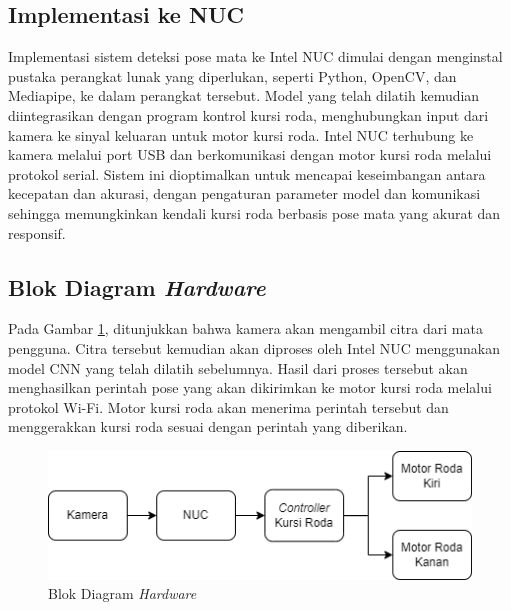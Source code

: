 \subsection{Implementasi ke NUC}

Implementasi sistem deteksi pose mata ke Intel NUC dimulai dengan menginstal pustaka perangkat lunak yang diperlukan, seperti Python, OpenCV, dan Mediapipe, ke dalam perangkat tersebut. Model yang telah dilatih kemudian diintegrasikan dengan program kontrol kursi roda, menghubungkan input dari kamera ke sinyal keluaran untuk motor kursi roda. Intel NUC terhubung ke kamera melalui port USB dan berkomunikasi dengan motor kursi roda melalui protokol serial. Sistem ini dioptimalkan untuk mencapai keseimbangan antara kecepatan dan akurasi, dengan pengaturan parameter model dan komunikasi sehingga memungkinkan kendali kursi roda berbasis pose mata yang akurat dan responsif.

\subsection{Blok Diagram \textit{Hardware}}

Pada Gambar \ref{fig:aluralat}, ditunjukkan bahwa kamera akan mengambil citra dari mata pengguna. Citra tersebut kemudian akan diproses oleh Intel NUC menggunakan model CNN yang telah dilatih sebelumnya. Hasil dari proses tersebut akan menghasilkan perintah pose yang akan dikirimkan ke motor kursi roda melalui protokol Wi-Fi. Motor kursi roda akan menerima perintah tersebut dan menggerakkan kursi roda sesuai dengan perintah yang diberikan.

\begin{figure} [ht] \centering
  \includegraphics[scale=0.55]{gambar/bab3/aluralat.png}
  \caption{Blok Diagram \emph{Hardware}}
  \label{fig:aluralat}
\end{figure}